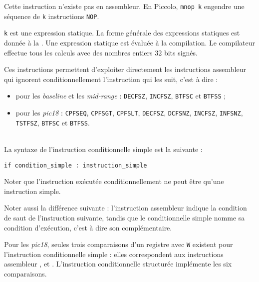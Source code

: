 
Cette instruction n'existe pas en assembleur. En Piccolo, \texttt{mnop k} engendre une séquence de \texttt{k} instructions \texttt{NOP}.

\texttt{k} est une expression statique. La forme générale des expressions statiques est donnée à la . Une expression statique est évaluée à la compilation. Le compilateur effectue tous les calculs avec des nombres entiers 32 bits signés.






Ces instructions permettent d'exploiter directement les instructions assembleur qui ignorent conditionnellement l'instruction qui les suit, c'est à dire :
\begin{itemize}
\item pour les \emph{baseline} et les \emph{mid-range} : \texttt{DECFSZ}, \texttt{INCFSZ}, \texttt{BTFSC} et \texttt{BTFSS} ;
\item pour les \emph{pic18} : \texttt{CPFSEQ}, \texttt{CPFSGT}, \texttt{CPFSLT}, \texttt{DECFSZ}, \texttt{DCFSNZ}, \texttt{INCFSZ}, \texttt{INFSNZ}, \texttt{TSTFSZ}, \texttt{BTFSC} et \texttt{BTFSS}.
\end{itemize}

~\\
La syntaxe de l'instruction conditionnelle simple est la suivante :

\begin{lstlisting}[language=piccolo]
if condition_simple : instruction_simple
\end{lstlisting}

Noter que l'instruction exécutée conditionnellement ne peut être qu'une instruction simple.

Noter aussi la différence suivante : l'instruction assembleur indique la condition de saut de l'instruction suivante, tandis que le conditionnelle simple nomme sa condition d'exécution, c'est à dire son complémentaire.

Pour les \emph{pic18}, seules trois comparaisons d'un registre avec \texttt{W} existent pour l'instruction conditionnelle simple : elles correspondent aux instructions assembleur ,  et . L'instruction conditionnelle structurée implémente les six comparaisons.

